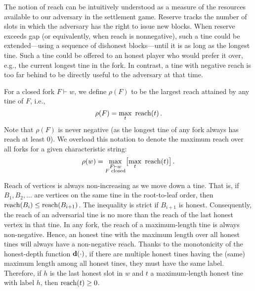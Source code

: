 The notion of reach can be intuitively understood as a measure of
the resources available to our adversary in the settlement
game. Reserve tracks the number of slots in which the adversary has
the right to issue new blocks.  When reserve exceeds gap (or
equivalently, when reach is nonnegative), such a tine could be
extended---using a sequence of dishonest blocks---until it is as long
as the longest tine. Such a tine could be offered to an honest player
who would prefer it over, e.g., the current longest tine in the
fork. In contrast, a tine with negative reach is too far behind to be
directly useful to the adversary at that time.

\begin{definition}
For a closed fork $F\vdash w$, we define $\rho(F)$ to be the largest reach attained by any tine of $F$, i.e., 
\[
\rho(F)=\underset{t}\max \ \reach(t)\,.
\]
Note that $\rho(F)$ is never negative (as the longest tine of any fork always has reach at least 0). We overload this notation to denote the maximum reach over all forks for a given characteristic string: 
\[
\rho(w)=\underset{\substack{F\vdash w\\\text{$F$ closed}}}\max\big[\underset{t}\max \ \operatorname{reach}(t)\big]\,.
\]
\end{definition}

Reach of vertices is always non-increasing as we move down a tine. 
That is, if $B_1, B_2, \ldots$ are vertices on the same tine in the root-to-leaf order, then 
$\operatorname{reach}(B_i) \leq \operatorname{reach}(B_{i+1})$. 
The inequality is strict if $B_{i + 1}$ is honest. 
Consequently, the reach of an adversarial tine is no more than 
the reach of the last honest vertex in that tine. 
In any fork, the reach of a maximum-length tine is always non-negative. 
Hence, an honest tine with the maximum length over all honest tines 
will always have a non-negative reach. 
Thanks to the monotonicity of the honest-depth function $\mathbf{d}(\cdot)$, 
if there are multiple honest tines 
having the (same) maximum length among all honest tines, 
they must have the same label. 
Therefore, if $h$ is the last honest slot in $w$ and 
$t$ a maximum-length honest tine with label $h$,  
then $\operatorname{reach}(t) \geq 0$. 



